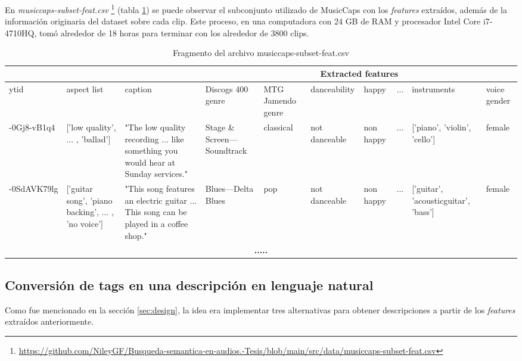 En \textit{musiccaps-subset-feat.csv} \footnote{\href{https://github.com/NileyGF/Busqueda-semantica-en-audios.-Tesis/blob/main/src/data/musiccaps-subset-feat.csv}{https://github.com/NileyGF/Busqueda-semantica-en-audios.-Tesis/blob/main/src/data/musiccaps-subset-feat.csv}} (tabla \ref{tab:feat.csv}) se puede observar el subconjunto utilizado de MusicCaps con los \textit{features} extraídos, además de la información originaria del dataset sobre cada clip. Este proceso, en una computadora con 24 GB de RAM y procesador Intel Core i7-4710HQ, tomó alrededor de 18 horas para terminar con los alrededor de 3800 clips.
\begin{table}[h]
    \tiny
    \centering
    \begin{tabular} { | p{5em} | p{4em} | p{6em} | p{4em} | p{4.5em} | p{4.5em} | p{4em} | c | p{4.8em} | p{4em} |}
    \hline
     \multicolumn{3}{|c|}{ } & \multicolumn{7}{|c|}{Extracted features} \\
    \hline
        ytid    & aspect list & caption &Discogs 400 genre & MTG Jamendo genre &danceability & happy & ... &instruments & voice gender\\ 
    \hline
    -0Gj8-vB1q4 &['low quality', ... , 'ballad'] &"The low quality recording ... like something you would hear at Sunday services." & 
                                    Stage \& Screen---Soundtrack & classical &not danceable &non happy & ... & ['piano', 'violin', 'cello'] & female \\
    \hline
    -0SdAVK79lg &['guitar song', 'piano backing', ... , 'no voice'] &"This song features an electric guitar ... This song can be played in a coffee shop."  
                                &Blues---Delta Blues & pop &not danceable & non happy & ... & ['guitar', 'acousticguitar', 'bass'] & female \\
    \hline
    \multicolumn{10}{|c|}{ \textbf{.....} } \\ 
    \hline
    \end{tabular}
    \caption{Fragmento del archivo musiccaps-subset-feat.csv}
    \label{tab:feat.csv}
\end{table}

\subsection{Conversión de tags en una descripción en lenguaje natural}
\label{subsec:feat-to-text}

Como fue mencionado en la sección \ref{sec:design}, la idea era implementar tres alternativas para obtener descripciones a partir de los \textit{features} extraídos anteriormente. \\

